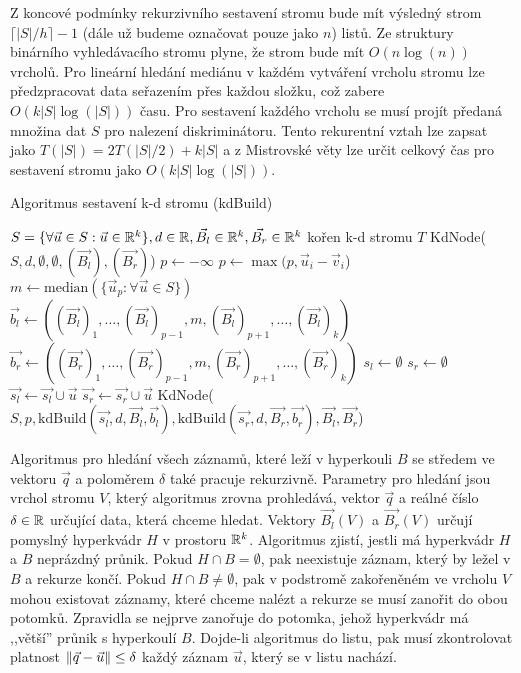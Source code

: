 Z koncové podmínky rekurzivního sestavení stromu bude mít výsledný strom $\lceil |S| / h \rceil - 1$ (dále už budeme označovat pouze jako $n$) listů. Ze struktury binárního vyhledávacího stromu plyne, že strom bude mít $O(n\log(n))$ vrcholů. Pro lineární hledání mediánu v každém vytváření vrcholu stromu lze předzpracovat data seřazením přes každou složku, což zabere $O(k|S|\log(|S|))$ času. Pro sestavení každého vrcholu se musí projít předaná množina dat $S$ pro nalezení diskriminátoru. Tento rekurentní vztah lze zapsat jako $T(|S|) = 2T(|S|/2) + k|S|$ a z Mistrovské věty lze určit celkový čas pro sestavení stromu jako $O(k|S|\log(|S|))$.

\begin{algorithm}[h!]
  \caption{Algoritmus sestavení k-d stromu (kdBuild)}
  \label{algo:kd-tree-build}
  \begin{algorithmic}
    \REQUIRE $S = \{\forall \vec{u} \in S: \vec{u} \in \mathbb{R}^k\}, d \in \mathbb{R}, \vec{B_l} \in \mathbb{R}^k, \vec{B_r} \in \mathbb{R}^k$
    \ENSURE kořen k-d stromu $T$
      \RETURN KdNode($S, d, \emptyset, \emptyset, (\vec{B_l}), (\vec{B_r})$)
    \ENDIF
    \STATE $p \leftarrow -\infty$
        \STATE $p \leftarrow \max(p, \vec{u}_i - \vec{v}_i$)
      \ENDFOR
    \ENDFOR
    \STATE $m \leftarrow \textrm{median}(\{\vec{u}_p: \forall \vec{u} \in S\})$ 
    \STATE $\vec{b_l} \leftarrow ((\vec{B_l})_1, \ldots, (\vec{B_l})_{p-1}, m, (\vec{B_l})_{p+1}, \ldots, (\vec{B_l})_k)$
    \STATE $\vec{b_r} \leftarrow ((\vec{B_r})_1, \ldots, (\vec{B_r})_{p-1}, m, (\vec{B_r})_{p+1}, \ldots, (\vec{B_r})_k)$
    \STATE $s_l \leftarrow \emptyset$
    \STATE $s_r \leftarrow \emptyset$
        \STATE $\vec{s_l} \leftarrow \vec{s_l} \cup \vec{u}$
      \ELSE
        \STATE $\vec{s_r} \leftarrow \vec{s_r} \cup \vec{u}$
      \ENDIF
    \ENDFOR
    \RETURN KdNode($S, p, \textrm{kdBuild}(\vec{s_l}, d, \vec{B_l}, \vec{b_l}), \textrm{kdBuild}(\vec{s_r}, d, \vec{B_r}, \vec{b_r}), \vec{B_l}, \vec{B_r}$)
  \end{algorithmic}
\end{algorithm}

Algoritmus pro hledání všech záznamů, které leží v hyperkouli $B$ se středem ve vektoru $\vec{q}$ a poloměrem $\delta$ také pracuje rekurzivně. Parametry pro hledání jsou vrchol stromu $V$, který algoritmus zrovna prohledává, vektor $\vec{q}$ a reálné číslo $\delta \in \mathbb{R}$ určující data, která chceme hledat. Vektory $\vec{B_l}(V)$ a $\vec{B_r}(V)$ určují pomyslný hyperkvádr $H$ v prostoru $\mathbb{R}^k$. Algoritmus zjistí, jestli má hyperkvádr $H$ a $B$ neprázdný průnik. Pokud $H \cap B = \emptyset$, pak neexistuje záznam, který by ležel v $B$ a rekurze končí. Pokud $H \cap B \neq \emptyset$, pak v podstromě zakořeněném ve vrcholu $V$ mohou existovat záznamy, které chceme nalézt a rekurze se musí zanořit do obou potomků. Zpravidla se nejprve zanořuje do potomka, jehož hyperkvádr má ,,větší'' průnik s hyperkoulí $B$. Dojde-li algoritmus do listu, pak musí zkontrolovat platnost $\|\vec{q} - \vec{u}\| \leq \delta$ každý záznam $\vec{u}$, který se v listu nachází. 

